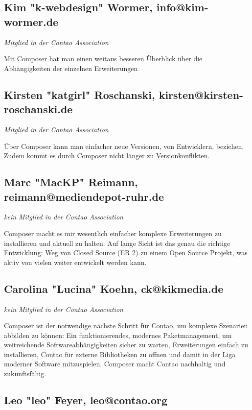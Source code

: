 \documentclass[
paper=a4,
draft=false,%
fontsize=10pt%
]{scrartcl}
\begin{document}
\subsection{Kim "k-webdesign" Wormer, info@kim-wormer.de}

\emph{Mitglied in der Contao Association}

Mit Composer hat man einen weitaus besseren Überblick über die Abhängigkeiten der einzelnen Erweiterungen

\subsection{Kirsten "katgirl" Roschanski, kirsten@kirsten-roschanski.de}

\emph{Mitglied in der Contao Association}

Über Composer kann man einfacher neue Versionen, von Entwicklern, beziehen.  Zudem kommt es durch Composer nicht länger zu Versionkonflikten.

\subsection{Marc "MacKP" Reimann, reimann@mediendepot-ruhr.de}

\emph{kein Mitglied in der Contao Association}

Composer macht es mir wesentlich einfacher komplexe Erweiterungen zu installieren und aktuell zu halten. Auf lange Sicht ist das genau die richtige Entwicklung: Weg von Closed Source (ER 2) zu einem Open Source Projekt, was aktiv von vielen weiter entwickelt werden kann.

\subsection{Carolina "Lucina" Koehn, ck@kikmedia.de}

\emph{kein Mitglied in der Contao Association}

Composer ist der notwendige nächste Schritt für Contao, um komplexe Szenarien abbilden zu können: Ein funktionierendes, modernes  Paketmanagement, um weitreichende Softwareabhängigkeiten sicher zu warten, Erweiterungen einfach zu installieren, Contao für externe Bibliotheken zu öffnen und damit in der Liga moderner Software mitzuspielen. Composer macht Contao nachhaltig und zukunftsfähig.

\subsection{Leo "leo" Feyer, leo@contao.org}
\end{document}
